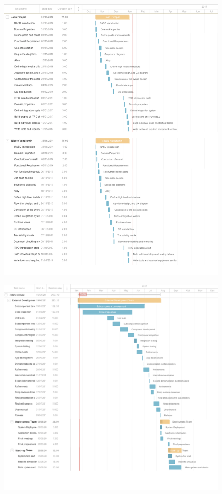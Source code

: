 \documentclass[a4paper,10pt]{article}
\begin{document}
    \begin{figure}[!h]
  \centering
    \includegraphics[scale=0.50]{Resources/scheduleJoanico.png}
  \end{figure}\FloatBarrier
      \begin{figure}[!h]
  \centering
    \includegraphics[scale=0.50]{Resources/ggdas.png}
  \end{figure}\FloatBarrier
\end{document}
